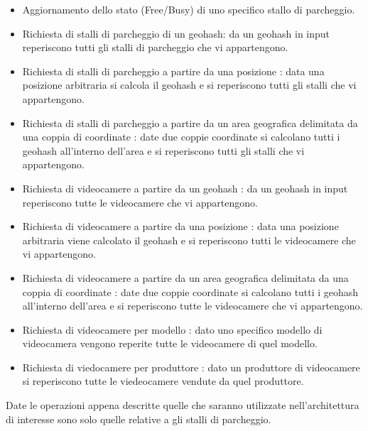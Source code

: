 \begin{itemize}
	\item Aggiornamento dello stato (Free/Busy) di uno specifico stallo di parcheggio.
	\item Richiesta di stalli di parcheggio di un geohash: da un geohash in input reperiscono tutti gli stalli di parcheggio che vi appartengono.
	\item Richiesta di stalli di parcheggio a partire da una posizione : data una posizione arbitraria si calcola il geohash e si reperiscono tutti gli stalli che vi appartengono.
	\item Richiesta di stalli di parcheggio a partire da un area geografica delimitata da una coppia di coordinate : date due coppie coordinate si calcolano tutti i geohash all'interno dell'area e si reperiscono tutti gli stalli che vi appartengono.
	\item Richiesta di videocamere a partire da un geohash : da un geohash in input reperiscono tutte le videocamere che vi appartengono.
	\item Richiesta di videocamere a partire da una posizione : data una posizione arbitraria viene calcolato il geohash e si reperiscono tutti le videocamere che vi appartengono.
	\item Richiesta di videocamere a partire da un area geografica delimitata da una coppia di coordinate : date due coppie coordinate si calcolano tutti i geohash all'interno dell'area e si reperiscono tutte le videocamere che vi appartengono.
	\item Richiesta di videocamere per modello : dato uno specifico modello di videocamera vengono reperite tutte le videocamere di quel modello.
	\item Richiesta di viedocamere per produttore : dato un produttore di videocamere si reperiscono tutte le viedeocamere vendute da quel produttore.
\end{itemize}

Date le operazioni appena descritte quelle che saranno utilizzate nell'architettura di interesse sono solo quelle relative a gli stalli di parcheggio.
\vspace{0.5truecm}


